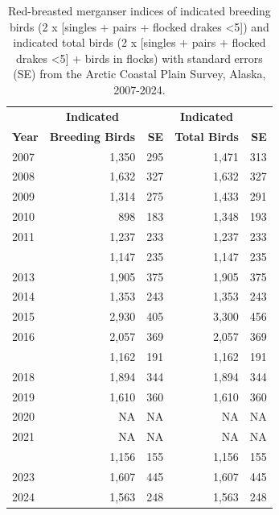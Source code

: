 \documentclass[
]{article}
\begin{document}
\begingroup\fontsize{10}{12}\selectfont

\begin{longtable}[t]{lrrrr}

\caption{\label{tbl-RBME}Red-breasted merganser indices of indicated
breeding birds (2 x {[}singles + pairs + flocked drakes \textless5{]})
and indicated total birds (2 x {[}singles + pairs + flocked drakes
\textless5{]} + birds in flocks) with standard errors (SE) from the
Arctic Coastal Plain Survey, Alaska, 2007-2024.}

\tabularnewline

\\
\toprule
\multicolumn{1}{c}{\textbf{ }} & \multicolumn{1}{c}{\textbf{Indicated}} & \multicolumn{1}{c}{\textbf{ }} & \multicolumn{1}{c}{\textbf{Indicated}} & \multicolumn{1}{c}{\textbf{ }} \\
\cmidrule(l{3pt}r{3pt}){2-2} \cmidrule(l{3pt}r{3pt}){4-4}
\textbf{Year} & \textbf{Breeding Birds} & \textbf{SE} & \textbf{Total Birds} & \textbf{SE}\\
\midrule
2007 & 1,350 & 295 & 1,471 & 313\\
2008 & 1,632 & 327 & 1,632 & 327\\
2009 & 1,314 & 275 & 1,433 & 291\\
2010 & 898 & 183 & 1,348 & 193\\
2011 & 1,237 & 233 & 1,237 & 233\\
\addlinespace
2012 & 1,147 & 235 & 1,147 & 235\\
2013 & 1,905 & 375 & 1,905 & 375\\
2014 & 1,353 & 243 & 1,353 & 243\\
2015 & 2,930 & 405 & 3,300 & 456\\
2016 & 2,057 & 369 & 2,057 & 369\\
\addlinespace
2017 & 1,162 & 191 & 1,162 & 191\\
2018 & 1,894 & 344 & 1,894 & 344\\
2019 & 1,610 & 360 & 1,610 & 360\\
2020 & NA & NA & NA & NA\\
2021 & NA & NA & NA & NA\\
\addlinespace
2022 & 1,156 & 155 & 1,156 & 155\\
2023 & 1,607 & 445 & 1,607 & 445\\
2024 & 1,563 & 248 & 1,563 & 248\\
\bottomrule

\end{longtable}
\end{document}
